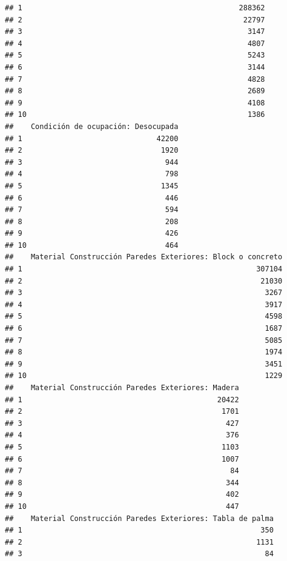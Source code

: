 \documentclass[11pt,]{article}
\begin{document}
\begin{verbatim}
## 1                                                  288362
## 2                                                   22797
## 3                                                    3147
## 4                                                    4807
## 5                                                    5243
## 6                                                    3144
## 7                                                    4828
## 8                                                    2689
## 9                                                    4108
## 10                                                   1386
##    Condición de ocupación: Desocupada
## 1                               42200
## 2                                1920
## 3                                 944
## 4                                 798
## 5                                1345
## 6                                 446
## 7                                 594
## 8                                 208
## 9                                 426
## 10                                464
##    Material Construcción Paredes Exteriores: Block o concreto
## 1                                                      307104
## 2                                                       21030
## 3                                                        3267
## 4                                                        3917
## 5                                                        4598
## 6                                                        1687
## 7                                                        5085
## 8                                                        1974
## 9                                                        3451
## 10                                                       1229
##    Material Construcción Paredes Exteriores: Madera
## 1                                             20422
## 2                                              1701
## 3                                               427
## 4                                               376
## 5                                              1103
## 6                                              1007
## 7                                                84
## 8                                               344
## 9                                               402
## 10                                              447
##    Material Construcción Paredes Exteriores: Tabla de palma
## 1                                                       350
## 2                                                      1131
## 3                                                        84

\end{verbatim}
\end{document}
